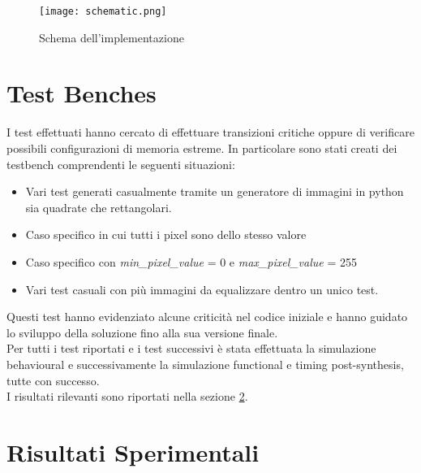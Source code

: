 \documentclass{article}
\begin{document}
\vspace*{1cm}


\begin{figure}[h!]
    \centering
    \texttt{[image: schematic.png]}
    \caption{Schema dell'implementazione}
    \label{fig:schematic}
\end{figure}




\section{Test Benches}
\label{test}

I test effettuati hanno cercato di effettuare transizioni critiche oppure di verificare possibili configurazioni di memoria estreme. In particolare sono stati creati dei testbench
comprendenti le seguenti situazioni:

\begin{itemize}
\item Vari test generati casualmente tramite un generatore di immagini in python sia quadrate che rettangolari.
\item Caso specifico in cui tutti i pixel sono dello stesso valore
\item Caso specifico con \textit{min\_pixel\_value} = 0 e \textit{max\_pixel\_value} = 255
\item Vari test casuali con più immagini da equalizzare dentro un unico test.
\end{itemize}

Questi test hanno evidenziato alcune criticità nel codice iniziale e hanno guidato lo sviluppo della soluzione fino alla sua versione finale.\\

Per tutti i test riportati e i test successivi è stata effettuata la simulazione behavioural e successivamente la simulazione functional e timing post-synthesis, tutte con successo.\\

I risultati rilevanti sono riportati nella sezione \ref{risultati}.

\section{Risultati Sperimentali}
\label{risultati}
\end{document}
